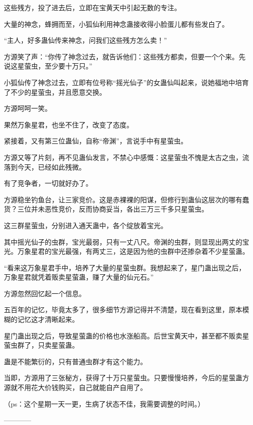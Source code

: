 \begin{this_body}
这些残方，投了进去后，立即在宝黄天中引起无数的专注。

大量的神念，蜂拥而至，小狐仙利用神念蛊接收得小脸蛋儿都有些发白了。

“主人，好多蛊仙传来神念，问我们这些残方怎么卖！”

方源笑了声：“你传了神念过去，就告诉他们：这些残方都卖，但要一个个来。先说这星萤虫，至少要十万只。”

小狐仙传了神念过去，立即有位号称“摇光仙子”的女蛊仙叫起来，说她福地中培育了不少的星萤虫，并且愿意交换。

方源呵呵一笑。

果然万象星君，也坐不住了，改变了态度。

紧接着，又有第三位蛊仙，自称“帝渊”，言说手中有星萤虫。

方源又等了片刻，再不见蛊仙发言，不禁心中感慨：这星萤虫不愧是太古之虫，流落到今天，已经如此残微。

有了竞争者，一切就好办了。

方源稳坐钓鱼台，让三家竞价。这是赤裸裸的阳谋，但修行到蛊仙这层次的哪有蠢货？三位并未恶性竞价，反而协商妥当，各出三万三千多只星萤虫。

这三群星萤虫，分别进入通天蛊中，各个绽放着宝光。

其中摇光仙子的虫群，宝光最弱，只有一丈八尺。帝渊的虫群，则显现出两丈的宝光。万象星君的宝光最强，有两丈三，这是因为他的虫群中还掺杂着不少星萤蛊。

“看来这万象星君手中，培养了大量的星萤虫群。我想起来了，星门蛊出现之后，万象星君就凭着贩卖星萤蛊，赚了大量的仙元石。”

方源忽然回忆起一个信息。

五百年的记忆，毕竟太多了，很多细节方源记得并不清楚，现在看到这里，原本模糊的记忆这才清晰起来。

星门蛊出现之后，导致星萤蛊的价格也水涨船高。后世宝黄天中，甚至都不贩卖星萤虫群了，只卖星萤蛊。

蛊是不能繁衍的，只有普通虫群才有这个能力。

当即，方源用了三张秘方，获得了十万只星萤虫。只要慢慢培养，今后的星萤蛊方源就不用花大价钱购买，自己就能自产自用了。

（ps：这个星期一天一更，生病了状态不佳，我需要调整的时间。）

------------

\end{this_body}

